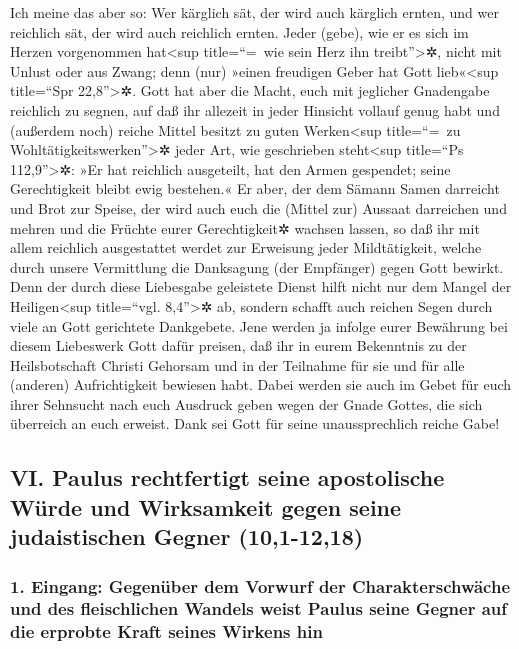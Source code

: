  Ich meine das aber so: Wer kärglich sät, der wird auch
kärglich ernten, und wer reichlich sät, der wird auch reichlich ernten.
 Jeder (gebe), wie er es sich im Herzen vorgenommen
hat\textless sup title=``=~wie sein Herz ihn treibt''\textgreater✲,
nicht mit Unlust oder aus Zwang; denn (nur) »einen freudigen Geber hat
Gott lieb«\textless sup title=``Spr 22,8''\textgreater✲. 
Gott hat aber die Macht, euch mit jeglicher Gnadengabe reichlich zu
segnen, auf daß ihr allezeit in jeder Hinsicht vollauf genug habt und
(außerdem noch) reiche Mittel besitzt zu guten Werken\textless sup
title=``=~zu Wohltätigkeitswerken''\textgreater✲ jeder Art,
 wie geschrieben steht\textless sup title=``Ps
112,9''\textgreater✲: »Er hat reichlich ausgeteilt, hat den Armen
gespendet; seine Gerechtigkeit bleibt ewig bestehen.«  Er
aber, der dem Sämann Samen darreicht und Brot zur Speise, der wird auch
euch die (Mittel zur) Aussaat darreichen und mehren und die Früchte
eurer Gerechtigkeit✲ wachsen lassen,  so daß ihr mit
allem reichlich ausgestattet werdet zur Erweisung jeder Mildtätigkeit,
welche durch unsere Vermittlung die Danksagung (der Empfänger) gegen
Gott bewirkt.  Denn der durch diese Liebesgabe geleistete
Dienst hilft nicht nur dem Mangel der Heiligen\textless sup title=``vgl.
8,4''\textgreater✲ ab, sondern schafft auch reichen Segen durch viele an
Gott gerichtete Dankgebete.  Jene werden ja infolge eurer
Bewährung bei diesem Liebeswerk Gott dafür preisen, daß ihr in eurem
Bekenntnis zu der Heilsbotschaft Christi Gehorsam und in der Teilnahme
für sie und für alle (anderen) Aufrichtigkeit bewiesen habt.
 Dabei werden sie auch im Gebet für euch ihrer Sehnsucht
nach euch Ausdruck geben wegen der Gnade Gottes, die sich überreich an
euch erweist.  Dank sei Gott für seine unaussprechlich
reiche Gabe!

\hypertarget{vi.-paulus-rechtfertigt-seine-apostolische-wuxfcrde-und-wirksamkeit-gegen-seine-judaistischen-gegner-101-1218}{%
\subsection{VI. Paulus rechtfertigt seine apostolische Würde und
Wirksamkeit gegen seine judaistischen Gegner
(10,1-12,18)}\label{vi.-paulus-rechtfertigt-seine-apostolische-wuxfcrde-und-wirksamkeit-gegen-seine-judaistischen-gegner-101-1218}}

\hypertarget{eingang-gegenuxfcber-dem-vorwurf-der-charakterschwuxe4che-und-des-fleischlichen-wandels-weist-paulus-seine-gegner-auf-die-erprobte-kraft-seines-wirkens-hin}{%
\subsubsection{1. Eingang: Gegenüber dem Vorwurf der Charakterschwäche
und des fleischlichen Wandels weist Paulus seine Gegner auf die erprobte
Kraft seines Wirkens
hin}\label{eingang-gegenuxfcber-dem-vorwurf-der-charakterschwuxe4che-und-des-fleischlichen-wandels-weist-paulus-seine-gegner-auf-die-erprobte-kraft-seines-wirkens-hin}}

